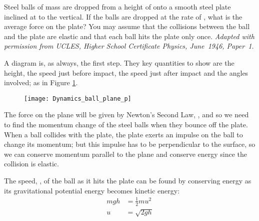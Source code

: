 
\begin{problem}[HSC1946P1X1a] %
{%
Steel balls of mass  are dropped from a height of  onto a smooth steel plate inclined at   to the vertical.  If the balls are dropped at the rate of , what is the average force on the plate? You may assume that the collisions between the ball and the plate are elastic and that each ball hits the plate only once.
}{\textit{Adapted with permission from UCLES, Higher School Certificate Physics, June~1946, Paper~1.}
}{ %
A diagram is, as always, the first step. They key quantities to show are the height, the speed just before impact, the speed just after impact and the angles involved; as in Figure \ref{fig:Dynamics_ball_plane_p}.

\begin{figure}[h]
	\centering
	\texttt{[image: Dynamics\_ball\_plane\_p]}
	\caption{}
	\label{fig:Dynamics_ball_plane_p}
\end{figure}

The force on the plane will be given by Newton's Second Law, , and so we need to find the momentum change of the steel balls when they bounce off the plate. When a ball collides with the plate, the plate exerts an impulse on the ball to change its momentum; but this impulse has to be perpendicular to the surface, so we can conserve momentum parallel to the plane and conserve energy since the collision is elastic.

The speed, , of the ball as it hits the plate can be found by conserving energy as its gravitational potential energy becomes kinetic energy:
\begin{eqnarray*} 
mgh &= \frac{1}{2}mu^{2} \\ 
u &= \sqrt{2gh}
\end{eqnarray*}

}
\end{problem}
